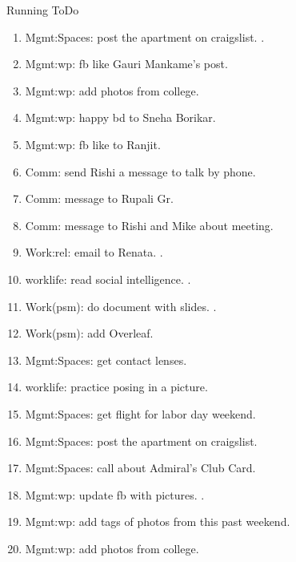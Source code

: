\begin{columns}
\begin{column}{0.6\linewidth}
\begin{block}{Running ToDo}
\begin{enumerate}
      \item \tiny Mgmt:Spaces: post the apartment on
        craigslist.  . 
        
      \item \tiny Mgmt:wp: fb like Gauri Mankame's post.

      \item \tiny Mgmt:wp: add photos from college. 

      \item \tiny Mgmt:wp: happy bd to Sneha Borikar. 

      \item \tiny Mgmt:wp: fb like to Ranjit. 

      \item \tiny Comm: send Rishi a message to talk by phone. 

      \item \tiny Comm: message to Rupali Gr.  

      \item \tiny Comm: message to Rishi and Mike about meeting.

      \item \tiny Work:rel: email to Renata. . 
      \item \tiny worklife: read social intelligence. .
        
      \item \tiny Work(psm): do document with slides. .    
      \item \tiny Work(psm): add Overleaf. 
        
      \item \tiny Mgmt:Spaces: get contact lenses. 
        
      \item \tiny worklife: practice posing in a picture.  
      \item \tiny Mgmt:Spaces: get flight for labor day weekend. 
 
      \item \tiny Mgmt:Spaces: post the apartment on craigslist. 
      \item \tiny Mgmt:Spaces: call about Admiral's Club Card.  
      \item \tiny Mgmt:wp: update fb with pictures.   . 
        
      \item \tiny Mgmt:wp: add tags of photos from this past weekend. 
      \item \tiny Mgmt:wp: add photos from college. 


\end{enumerate}
\end{block}
\end{column}
\end{columns}
